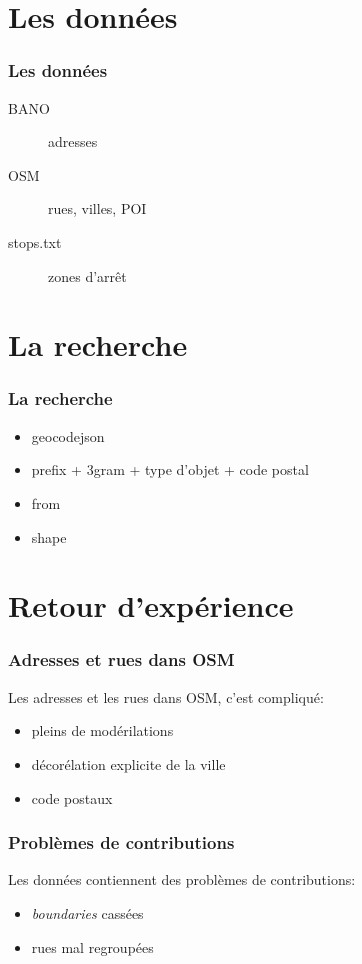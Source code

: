\documentclass[table]{beamer}
\newcommand*{\foreign}[2][english]{%
    \emph{\foreignlanguage{#1}{#2}}%
}
\begin{document}
\section{Les données}

\begin{frame}
  \frametitle{Les données}

  \begin{description}
  \item[BANO] adresses
  \item[OSM] rues, villes, POI
  \item[stops.txt] zones d'arrêt
  \end{description}
\end{frame}

\section{La recherche}

\begin{frame}
  \frametitle{La recherche}

  \begin{itemize}
  \item geocodejson
  \item prefix + 3gram + type d'objet + code postal
  \item from
  \item shape
  \end{itemize}
\end{frame}

\section{Retour d'expérience}

\begin{frame}
  \frametitle{Adresses et rues dans OSM}

  Les adresses et les rues dans OSM, c'est compliqué:
  \begin{itemize}
  \item pleins de modérilations
  \item décorélation explicite de la ville
  \item code postaux
  \end{itemize}
\end{frame}

\begin{frame}
  \frametitle{Problèmes de contributions}

  Les données contiennent des problèmes de contributions:
  \begin{itemize}
  \item \foreign{boundaries} cassées
  \item rues mal regroupées
  \end{itemize}
\end{frame}
\end{document}
